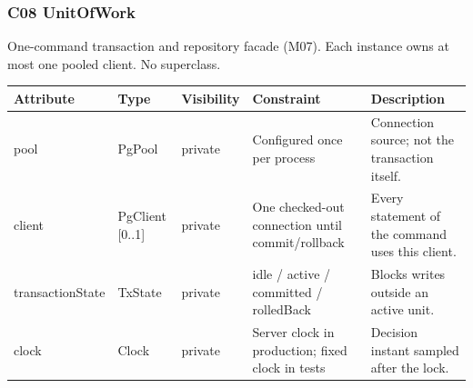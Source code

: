 \subsubsection{C08 UnitOfWork}

One-command transaction and repository facade (M07). Each instance owns at most one pooled client. No superclass.\par

\small
\setlength{\tabcolsep}{3pt}
\renewcommand{\arraystretch}{1.12}
\begin{longtable}{|p{}|p{}|p{}|p{}|p{}|}
\hline
\textbf{Attribute} & \textbf{Type} & \textbf{Visibility} & \textbf{Constraint} & \textbf{Description} \\ \hline
\endfirsthead \hline
pool & PgPool & private & Configured once per process & Connection source; not the transaction itself. \\ \hline
client & PgClient [0..1] & private & One checked-out connection until commit/rollback & Every statement of the command uses this client. \\ \hline
transaction\allowbreak State & TxState & private & idle / active / committed / rolledBack & Blocks writes outside an active unit. \\ \hline
clock & Clock & private & Server clock in production; fixed clock in tests & Decision instant sampled after the lock. \\ \hline
\end{longtable}
\normalsize

